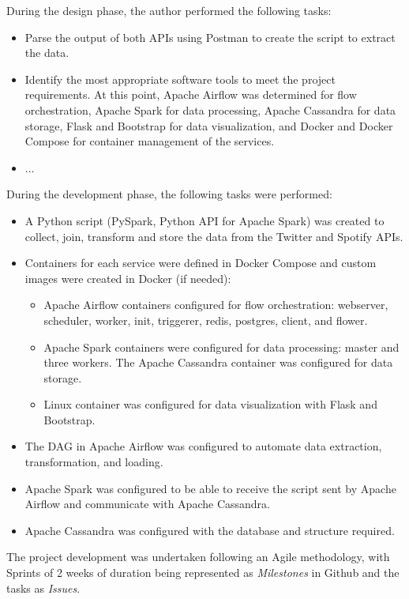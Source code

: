 \nonzeroparskip During the design phase, the author performed the following tasks:
\begin{itemize}
	\item Parse the output of both APIs using Postman to create the script to extract the data.
	\item Identify the most appropriate software tools to meet the project requirements. At this point, Apache Airflow was determined for flow orchestration, Apache Spark for data processing, Apache Cassandra for data storage, Flask and Bootstrap for data visualization, and Docker and Docker Compose for container management of the services.
	\item ...
\end{itemize}

\nonzeroparskip During the development phase, the following tasks were performed:
\begin{itemize}
	\item A Python script (PySpark, Python API for Apache Spark) was created to collect, join, transform and store the data from the Twitter and Spotify APIs.
	\item Containers for each service were defined in Docker Compose and custom images were created in Docker (if needed):
	\begin{itemize}
		\item Apache Airflow containers configured for flow orchestration: webserver, scheduler, worker, init, triggerer, redis, postgres, client, and flower.
		\item Apache Spark containers were configured for data processing: master and three workers.
The Apache Cassandra container was configured for data storage.
		\item Linux container was configured for data visualization with Flask and Bootstrap.
	\end{itemize}
	\item The DAG in Apache Airflow was configured to automate data extraction, transformation, and loading.
	\item Apache Spark was configured to be able to receive the script sent by Apache Airflow and communicate with Apache Cassandra.
	\item Apache Cassandra was configured with the database and structure required.
\end{itemize}

\nonzeroparskip The project development was undertaken following an Agile methodology, with Sprints of 2 weeks of duration being represented as \textit{Milestones} in Github and the tasks as \textit{Issues}.